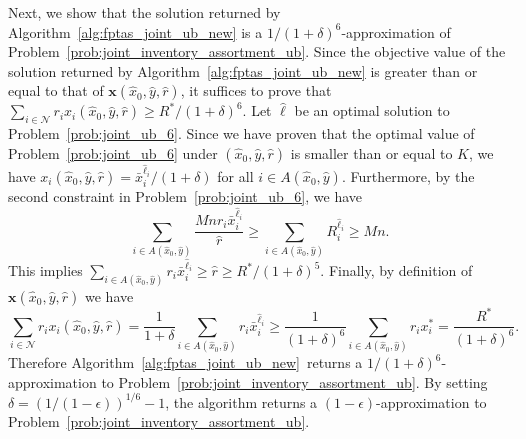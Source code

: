 \documentclass[mnsc,non-blindrev]{informs3}
\theoremstyle{definition}
\begin{document}
\begin{appendices}{\Large{}}
{Next, we show that the solution returned by Algorithm~\ref{alg:fptas_joint_ub_new} is a $1/(1+\delta)^6$-approximation of Problem~\eqref{prob:joint_inventory_assortment_ub}. Since the objective value of the solution returned by Algorithm~\ref{alg:fptas_joint_ub_new} is greater than or equal to that of $\bm{x}(\hat{x}_0,\hat{y},\hat{r})$, it suffices to prove that $\sum_{i\in\mathcal{N}}r_ix_i(\hat{x}_0,\hat{y},\hat{r})\geq R^*/(1+\delta)^6$. Let $\hat{\bm{\ell}}$ be an optimal solution to Problem~\eqref{prob:joint_ub_6}. Since we have proven that the optimal value of Problem~\eqref{prob:joint_ub_6} under $(\hat{x}_0,\hat{y},\hat{r})$ is smaller than or equal to $K$, we have $x_i(\hat{x}_0,\hat{y},\hat{r})=\bar{x}_i^{\hat{\ell}_i}/(1+\delta)$ for all $i\in A(\hat{x}_0,\hat{y})$. Furthermore, by the second constraint in Problem~\eqref{prob:joint_ub_6}, we have
\begin{equation*}
\sum_{i\in A(\hat{x}_0,\hat{y})} \dfrac{Mnr_i\bar{x}_i^{\hat{\ell}_i}}{\hat{r}}\geq \sum_{i\in A(\hat{x}_0,\hat{y})}R_i^{\hat{\ell}_i}\geq Mn.
\end{equation*}
This implies $\sum_{i\in A(\hat{x}_0,\hat{y})}r_i\bar{x}_i^{\hat{\ell}_i}\geq \hat{r}\geq R^*/(1+\delta)^5$. Finally, by definition of $\bm{x}(\hat{x}_0,\hat{y},\hat{r})$ we have
\begin{equation*}
\sum_{i\in\mathcal{N}}r_ix_i(\hat{x}_0,\hat{y},\hat{r})=\dfrac{1}{1+\delta}\sum_{i\in A(\hat{x}_0,\hat{y})}r_i\bar{x}_i^{\hat{\ell}_i}\geq \dfrac{1}{(1+\delta)^6}\sum_{i\in A(\hat{x}_0,\hat{y})}r_ix_i^*=\dfrac{R^*}{(1+\delta)^6}.
\end{equation*}
Therefore Algorithm~\ref{alg:fptas_joint_ub_new}~returns a $1/(1+\delta)^6$-approximation to Problem~\eqref{prob:joint_inventory_assortment_ub}. By setting $\delta=(1/(1-\epsilon))^{1/6}-1$, the algorithm returns a $(1-\epsilon)$-approximation to Problem~\eqref{prob:joint_inventory_assortment_ub}.

}
\end{appendices}
\end{document}
